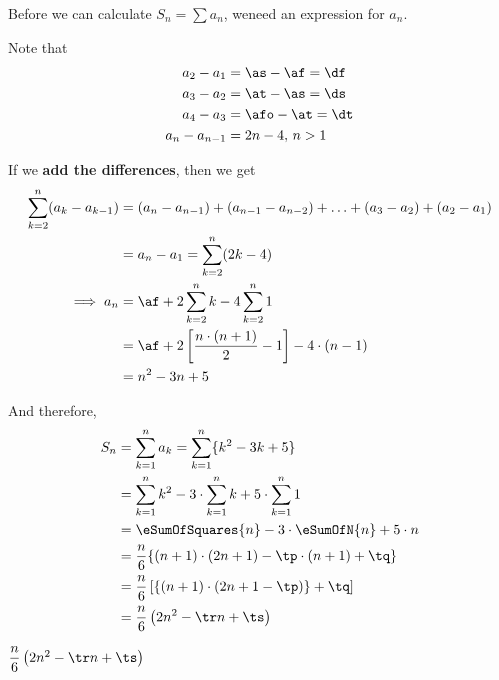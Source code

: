 \begin{solution}[\halfpage]
  Before we can calculate $S_n=\sum a_n$, weneed an expression for $a_n$. 

  Note that
  \begin{align}
    a_2 - a_1 &= \as-\af=\df \\
    a_3 - a_2 &= \at-\as=\ds \\
    a_4-a_3 &= \afo-\at = \dt \\
    a_n - a_{n-1} &= \vj n - \vk,\, n > 1 \\
  \end{align}

  If we \textbf{add the differences}, then we get 
  \begin{align}
    \sum_{k=2}^n (a_k - a_{k-1}) &= (a_n-a_{n-1}) + (a_{n-1}-a_{n-2}) + \ldots + (a_3-a_2) + (a_2-a_1)  \\
     &= a_n-a_1 = \sum_{k=2}^n (\vj k - \vk) \\
     \implies a_n &= \af + \vj\sum_{k=2}^n k -\vk\sum_{k=2}^n 1 \\
                  &= \af + 2\left[ \dfrac{n\cdot (n+1)}{2} - 1\right] - \vk\cdot( n - 1) \\
                  &= n^2-\va n + \vb
  \end{align}
  
  And therefore,
	\begin{align}
		S_n &= \sum_{k=1}^{n}a_k = \sum_{k=1}^{n}\lbrace k^2 - \va k + \vb \rbrace \\
		&= \sum_{k=1}^{n}k^2 - \va\cdot\sum_{k=1}^{n}k + \vb\cdot\sum_{k=1}^{n}1 \\
		&= \eSumOfSquares{n} - \va\cdot\eSumOfN{n} + \vb\cdot n \\
    &= \dfrac{n}{6}\lbrace (n+1)\cdot(2n+1) - \tp\cdot(n+1) + \tq \rbrace \\
    &= \dfrac{n}{6}\left[ \lbrace (n+1)\cdot(2n + 1 - \tp)\rbrace + \tq \right] \\
    &= \dfrac{n}{6}\left( 2n^2 - \tr n + \ts \right)
	\end{align}
\end{solution}
\ifprintanswers
  \begin{codex}
    $\dfrac{n}{6}\left( 2n^2 - \tr n + \ts \right)$
  \end{codex}
\fi
